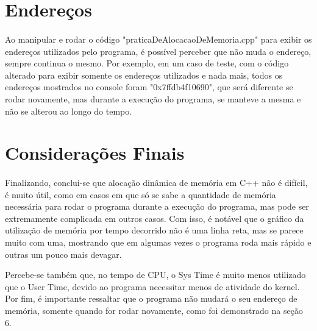 \documentclass{article}
\begin{document}
\section{Endereços}
\paragraph{} Ao manipular e rodar o código "praticaDeAlocacaoDeMemoria.cpp" para exibir os endereços utilizados pelo programa, é possível perceber que não muda o endereço, sempre continua o mesmo. Por exemplo, em um caso de teste, com o código alterado para exibir somente os endereços utilizados e nada mais, todos os endereços mostrados no console foram "0x7ffdb4f10690", que será diferente se rodar novamente, mas durante a execução do programa, se manteve a mesma e não se alterou ao longo do tempo.

\section{Considerações Finais}
\paragraph{} Finalizando, conclui-se que alocação dinâmica de memória em C++ não é difícil, é muito útil, como em casos em que só se sabe a quantidade de memória necessária para rodar o programa durante a execução do programa, mas pode ser extremamente complicada em outros casos. Com isso, é notável que o gráfico da utilização de memória por tempo decorrido não é uma linha reta, mas se parece muito com uma, mostrando que em algumas vezes o programa roda mais rápido e outras um pouco mais devagar.  \par
Percebe-se também que, no tempo de CPU, o Sys Time é muito menos utilizado que o User Time, devido ao programa necessitar menos de atividade do kernel. Por fim, é importante ressaltar que o programa não mudará o seu endereço de memória, somente quando for rodar novamente, como foi demonstrado na seção 6.
\end{document}
